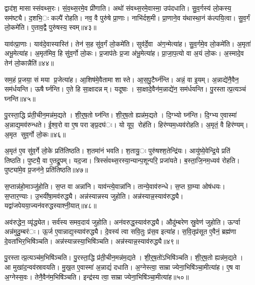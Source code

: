 द्वाद॑श॒ मासास्संवथ्स॒रः। सं॒व॒थ्स॒रमे॒व प्री॑णाति। अथो॑ संवथ्स॒रमे॒वास्मा॒ उप॑दधाति। सु॒व॒र्गस्य॑ लो॒कस्य॒ सम॑ष्ट्यै। द॒शभि॒ः कल्पै॑ रोहति। नव॒ वै पुरु॑षे प्रा॒णाः। नाभि॑र्दश॒मी। प्रा॒णाने॒व य॑थास्था॒नं क॑ल्पयि॒त्वा। सु॒व॒र्गं लो॒कमे॑ति। ए॒ताव॒द्वै पुरु॑षस्य॒ स्वम्॥४३॥

याव॑त्प्रा॒णाः। याव॑दे॒वास्यास्ति॑। तेन॑ स॒ह सु॑व॒र्गं लो॒कमे॑ति। सुव॑र्दे॒वा अ॑ग॒न्मेत्या॑ह। सु॒व॒र्गमे॒व लो॒कमे॑ति। अ॒मृता॑ अभू॒मेत्या॑ह। अ॒मृत॑मिव॒ हि सु॑व॒र्गो लो॒कः। प्र॒जाप॑तेः प्र॒जा अ॑भू॒मेत्या॑ह। प्रा॒जा॒प॒त्यो वा अ॒यं लो॒कः। अ॒स्मादे॒व तेन॑ लो॒कान्नैति॑॥४४॥

सम॒हं प्र॒जया॒ सं मया प्र॒जेत्या॑ह। आ॒शिष॑मे॒वैतामा शास्ते। आ॒स॒पु॒टैर्घ्न॑न्ति। अन्नं॒ वा इ॒यम्। अ॒न्नाद्ये॑नै॒वैन॒ सम॑र्धयन्ति। ऊषैर्घ्नन्ति। ए॒ते हि सा॒क्षादन्नम्। यदूषाः। सा॒क्षादे॒वैन॑म॒न्नाद्ये॑न॒ सम॑र्धयन्ति। पु॒रस्तात्प्र॒त्यञ्चं घ्नन्ति॥४५॥

पु॒रस्ता॒द्धि प्र॑ती॒चीन॒मन्न॑म॒द्यते। शी॒र्॒ष॒तो घ्न॑न्ति। शी॒र्॒ष॒तो ह्यन्न॑म॒द्यते। दि॒ग्भ्यो घ्न॑न्ति। दि॒ग्भ्य ए॒वास्मा॑ अ॒न्नाद्य॒मव॑रुन्धते। ई॒श्व॒रो वा ए॒ष पराङ्प्र॒दघ॑ः। यो यूप॒ रोह॑ति। हिर॑ण्यम॒ध्यव॑रोहति। अ॒मृतं॒ वै हिर॑ण्यम्। अ॒मृत सुव॒र्गो लो॒कः॥४६॥

अ॒मृत॑ ए॒व सु॑व॒र्गे लो॒के प्रति॑तिष्ठति। श॒तमा॑नं भवति। श॒तायु॒ः पुरु॑षश्श॒तेन्द्रि॑यः। आयु॑ष्ये॒वेन्द्रि॒ये प्रति॑ तिष्ठति। पुष्ट्यै॒ वा ए॒तद्रू॒पम्। यद॒जा। त्रिस्सं॑वथ्स॒रस्या॒न्यान्प॒शून्परि॒ प्रजा॑यते। ब॒स्ता॒जि॒नम॒ध्यव॑ रोहति। पुष्ट्या॑मे॒व प्र॒जन॑ने॒ प्रति॑तिष्ठति॥४७॥


स॒प्तान्न॑हो॒माञ्जु॑होति। स॒प्त वा अन्ना॑नि। याव॑न्त्ये॒वान्ना॑नि। तान्ये॒वाव॑रुन्धे। स॒प्त ग्रा॒म्या ओष॑धयः। स॒प्तार॒ण्याः। उ॒भयी॑षा॒मव॑रुद्ध्यै। अन्न॑स्यान्नस्य जुहोति। अन्न॑स्यान्न॒स्याव॑रुद्ध्यै। यद्वा॑जपेयया॒ज्यन॑वरुद्धस्याश्नी॒यात्॥४८॥

अव॑रुद्धेन॒ व्यृ॑द्ध्येत। सर्व॑स्य समव॒दाय॑ जुहोति। अन॑वरुद्ध॒स्याव॑रुद्ध्यै। औदु॑म्बरेण स्रु॒वेण॑ जुहोति। ऊर्ग्वा अन्न॑मुदु॒म्बर॑ः। ऊ॒र्ज ए॒वान्नाद्य॒स्याव॑रुद्ध्यै। दे॒वस्य॑ त्वा सवि॒तुः प्र॑स॒व इत्या॑ह। स॒वि॒तृप्र॑सूत ए॒वैनं॒ ब्रह्म॑णा दे॒वता॑भिर॒भिषि॑ञ्चति। अन्न॑स्यान्नस्या॒भिषि॑ञ्चति। अन्न॑स्यान्न॒स्याव॑रुद्ध्यै॥४९॥

पु॒रस्तात्प्र॒त्यञ्च॑म॒भिषि॑ञ्चति। पु॒रस्ता॒द्धि प्र॑ती॒चीन॒मन्न॑म॒द्यते। शी॒र्॒ष॒तो॑ऽभिषि॑ञ्चति। शी॒र्॒ष॒तो ह्यन्न॑म॒द्यते। आ मुखा॑द॒न्वव॑स्रावयति। मु॒ख॒त ए॒वास्मा॑ अ॒न्नाद्यं॑ दधाति। अ॒ग्नेस्त्वा॒ साम्राज्येना॒भिषि॑ञ्चा॒मीत्या॑ह। ए॒ष वा अ॒ग्नेस्स॒वः। तेनै॒वैन॑म॒भिषि॑ञ्चति। इन्द्र॑स्य त्वा॒ साम्राज्येना॒भिषि॑ञ्चा॒मीत्या॑ह॥५०॥

